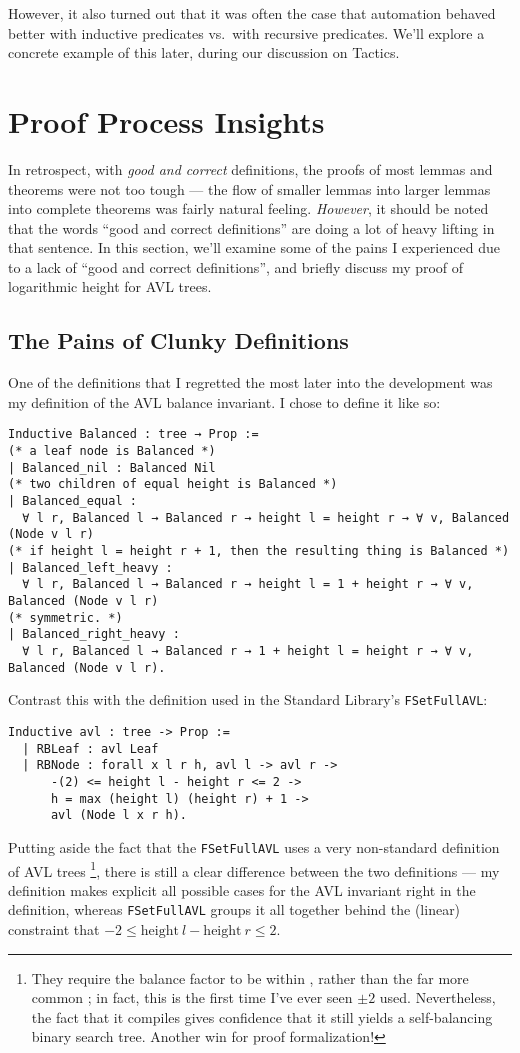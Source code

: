\documentclass[acmsmall, authorversion, nonacm, overload]{acmart}
\begin{document}
However, it also turned out that it was often the case that automation behaved better
with inductive predicates vs.\ with recursive predicates.
We'll explore a concrete example of this later, during our discussion on Tactics.

\section{Proof Process Insights}

In retrospect, with \emph{good and correct} definitions, the proofs of
most lemmas and theorems were not too tough --- the flow of smaller lemmas
into larger lemmas into complete theorems was fairly natural feeling.
\emph{However}, it should be noted that
the words ``good and correct definitions'' are doing a lot of heavy lifting in that sentence.
In this section, we'll examine some of the pains I experienced due to a lack of ``good and correct definitions'',
and briefly discuss my proof of logarithmic height for AVL trees.

\subsection{The Pains of Clunky Definitions}

One of the definitions that I regretted the most later into the development
was my definition of the AVL balance invariant.
I chose to define it like so:
\begin{verbatim}
Inductive Balanced : tree → Prop :=
(* a leaf node is Balanced *)
| Balanced_nil : Balanced Nil
(* two children of equal height is Balanced *)
| Balanced_equal :
  ∀ l r, Balanced l → Balanced r → height l = height r → ∀ v, Balanced (Node v l r)
(* if height l = height r + 1, then the resulting thing is Balanced *)
| Balanced_left_heavy :
  ∀ l r, Balanced l → Balanced r → height l = 1 + height r → ∀ v, Balanced (Node v l r)
(* symmetric. *)
| Balanced_right_heavy :
  ∀ l r, Balanced l → Balanced r → 1 + height l = height r → ∀ v, Balanced (Node v l r).
\end{verbatim}
Contrast this with the definition used in the Standard Library's \verb|FSetFullAVL|:
\begin{verbatim}
Inductive avl : tree -> Prop :=
  | RBLeaf : avl Leaf
  | RBNode : forall x l r h, avl l -> avl r ->
      -(2) <= height l - height r <= 2 ->
      h = max (height l) (height r) + 1 ->
      avl (Node l x r h).
\end{verbatim}
Putting aside the fact that the \verb|FSetFullAVL| uses a very non-standard definition of AVL trees
\footnote{They require the balance factor to be within , rather than the far more common ;
  in fact, this is the first time I've ever seen $\pm 2$ used. Nevertheless, the fact that it compiles
  gives confidence that it still yields a self-balancing binary search tree. Another win for proof formalization!},
there is still a clear difference between the two definitions ---
my definition makes explicit all possible cases for the AVL invariant right in the definition,
whereas \verb|FSetFullAVL| groups it all together behind the (linear) constraint that
$-2 \le \mathrm{height}\ l - \mathrm{height}\ r \le 2$.
\end{document}
